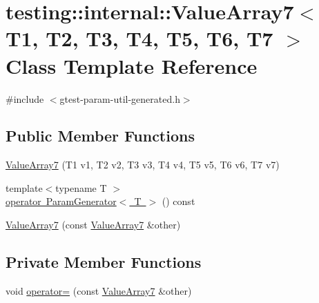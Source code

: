 \hypertarget{classtesting_1_1internal_1_1_value_array7}{}\section{testing\+::internal\+::Value\+Array7$<$ T1, T2, T3, T4, T5, T6, T7 $>$ Class Template Reference}
\label{classtesting_1_1internal_1_1_value_array7}


{\ttfamily \#include $<$gtest-\/param-\/util-\/generated.\+h$>$}

\subsection*{Public Member Functions}
\begin{DoxyCompactItemize}
\item 
\mbox{\hyperlink{classtesting_1_1internal_1_1_value_array7_a34570dbbcc50d20f94e4a0c693e42f09}{Value\+Array7}} (T1 v1, T2 v2, T3 v3, T4 v4, T5 v5, T6 v6, T7 v7)
\item 
{\footnotesize template$<$typename T $>$ }\\\mbox{\hyperlink{classtesting_1_1internal_1_1_value_array7_a4ab41f4a5687896e159c69f581d0a673}{operator Param\+Generator$<$ T $>$}} () const
\item 
\mbox{\hyperlink{classtesting_1_1internal_1_1_value_array7_ab4be0da0f772c885c6fe681ea486ece4}{Value\+Array7}} (const \mbox{\hyperlink{classtesting_1_1internal_1_1_value_array7}{Value\+Array7}} \&other)
\end{DoxyCompactItemize}
\subsection*{Private Member Functions}
\begin{DoxyCompactItemize}
\item 
void \mbox{\hyperlink{classtesting_1_1internal_1_1_value_array7_a24ff5b03981b3008a0f1af33161925ec}{operator=}} (const \mbox{\hyperlink{classtesting_1_1internal_1_1_value_array7}{Value\+Array7}} \&other)
\end{DoxyCompactItemize}
